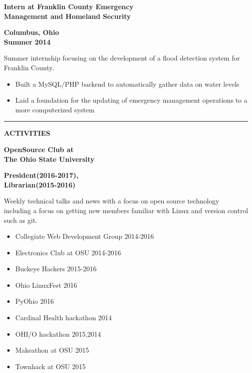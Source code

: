 \documentclass[letterpaper,10pt]{article}
\newcommand{\topic}[1]{\vspace{2mm} \rule[.5em]{10mm}{.2pt} {\large \bfseries #1} \xrfill[.5em]{.2pt} \newline}
\newcommand{\fullentry}[3] { \parbox[t]{.6\textwidth}{\large \bfseries #1} \hfill \parbox[t]{.4\textwidth}{\bfseries \raggedleft #2 \\ #3} \newline}
\begin{document}
		\fullentry{Intern at Franklin County Emergency\\ Management and Homeland Security}{Columbus, Ohio}{Summer 2014}
			Summer internship focusing on the development of a flood detection system for Franklin County.
			\begin{itemize}
				\item Built a MySQL/PHP backend to automatically gather data on water levels
				\item Laid a foundation for the updating of emergency management operations to a more computerized system
			\end{itemize}

	\topic{ACTIVITIES}

		\fullentry{OpenSource Club at\\ The Ohio State University}{President(2016-2017),}{Librarian(2015-2016)}
				Weekly technical talks and news with a focus on open source technology including a focus on getting new members familiar with Linux and version control such as git.

		\begin{multicols}{3} \bfseries \raggedright
			\begin{itemize}
				\item Collegiate Web Development Group 2014-2016
				\item Electronics Club at OSU 2014-2016
				\item Buckeye Hackers 2015-2016
				\item Ohio LinuxFest 2016
				\item PyOhio 2016
				\item Cardinal Health hackathon 2014
				\item OHI/O hackathon 2015,2014
				\item Makeathon at OSU 2015
				\item Townhack at OSU 2015
			\end{itemize}
		\end{multicols}
		
\end{document}
